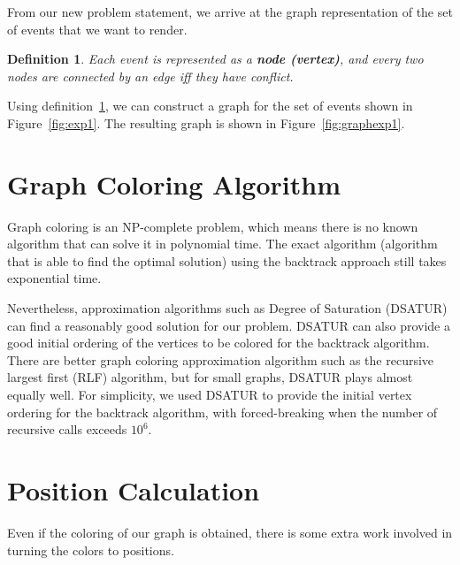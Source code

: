 \documentclass[12pt]{article}
\newtheorem{definition}{Definition}
\begin{document}
From our new problem statement, we arrive at the graph representation of the set of events that we want to render.

\begin{definition}\label{def:3}
    Each event is represented as a \textbf{node (vertex)}, and every two nodes are connected by an edge iff they have conflict.
\end{definition}

Using definition~\ref{def:3}, we can construct a graph for the set of events shown in Figure~\ref{fig:exp1}. The resulting graph is shown in Figure~\ref{fig:graphexp1}.

\section{Graph Coloring Algorithm}
Graph coloring is an NP-complete problem, which means there is no known algorithm that can solve it in polynomial time. The exact algorithm (algorithm that is able to find the optimal solution) using the backtrack approach still takes exponential time. 

Nevertheless, approximation algorithms such as Degree of Saturation (DSATUR) can find a reasonably good solution for our problem. DSATUR can also provide a good initial ordering of the vertices to be colored for the backtrack algorithm. There are better graph coloring approximation algorithm such as the recursive largest first (RLF) algorithm, but for small graphs, DSATUR plays almost equally well. For simplicity, we used DSATUR to provide the initial vertex ordering for the backtrack algorithm, with forced-breaking when the number of recursive calls exceeds $10^6$.

\section{Position Calculation}
Even if the coloring of our graph is obtained, there is some extra work involved in turning the colors to positions.
\end{document}
